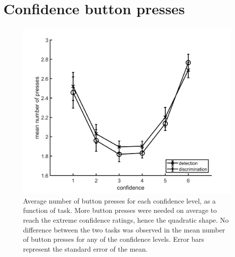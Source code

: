 \documentclass[12pt,twoside]{reedthesis}
\begin{document}
\hypertarget{app3:buttonpresses}{%
\section{Confidence button presses}\label{app3:buttonpresses}}
\begin{figure}[H]
\includegraphics[width=\linewidth]{figure/fMRI/buttonPresses} \caption[Button presses, imaging experiment]{Average number of button presses for each confidence level, as a function of task. More button presses were needed on average to reach the extreme confidence ratings, hence the quadratic shape. No difference between the two tasks was observed in the mean number of button presses for any of the confidence levels. Error bars represent the standard error of the mean.}\label{fig:buttonpresses}
\end{figure}
\newpage
\end{document}
